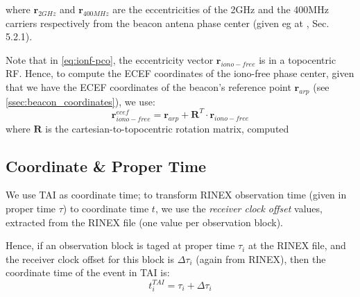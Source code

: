 where $\bm{r}_{2GHz}$ and $\bm{r}_{400MHz}$ are the eccentricities of the 
2GHz and the 400MHz carriers respectively from the beacon antena phase center 
(given eg at \cite{DORISGSM}, Sec. 5.2.1).

Note that in \ref{eq:ionf-pco}, the eccentricity vector $\bm{r}_{iono-free}$ 
is in a topocentric RF. Hence, to compute the ECEF coordinates of the 
iono-free phase center, given that we have the ECEF coordinates of the beacon's 
reference point $\bm{r}_{arp}$ (see \ref{ssec:beacon_coordinates}), we use:
\begin{equation}
  \bm{r}^{ecef}_{iono-free} = \bm{r}_{arp} + \bm{R}^T \cdot \bm{r}_{iono-free}
\end{equation}
where $\bm{R}$ is the cartesian-to-topocentric rotation matrix, computed 

\subsection{Coordinate \& Proper Time}
\label{ssec:coordinate-proper-time}
We use TAI as coordinate time; to transform RINEX observation time (given in 
proper time $\tau$) to coordinate time $t$, we use the \emph{receiver clock 
offset} values, extracted from the RINEX file (one value per observation block).

Hence, if an observation block is taged at proper time $\tau _i$ at the RINEX 
file, and the receiver clock offset for this block is $\Delta \tau _i$ (again from 
RINEX), then the coordinate time of the event in TAI is:
\begin{equation}
  t^{TAI}_i = \tau _i + \Delta \tau _i
\end{equation}
